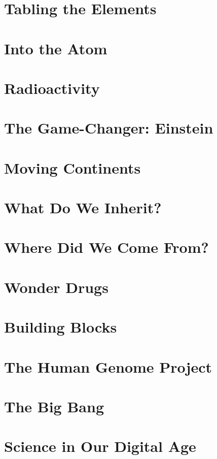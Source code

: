 \documentclass[a4paper,12pt]{article}
\begin{document}
\section{Tabling the Elements} %

\section{Into the Atom} %

\section{Radioactivity} %

\section{The Game-Changer: Einstein} %

\section{Moving Continents} %

\section{What Do We Inherit?} %

\section{Where Did We Come From?} %

\section{Wonder Drugs} %

\section{Building Blocks} %

\section{The Human Genome Project} %

\section{The Big Bang} %

\section{Science in Our Digital Age } %
\end{document}
